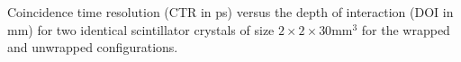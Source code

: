 \label{fig:ctrvsdoi} Coincidence time resolution (CTR in ps) versus the depth of interaction (DOI in mm) for two identical scintillator crystals of size $2\times2\times30$mm$^3$ for the wrapped and unwrapped configurations.